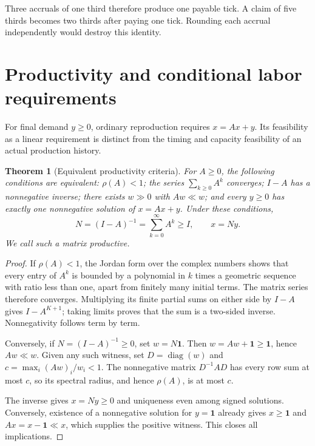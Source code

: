 \documentclass[11pt,a4paper]{article}
\newtheorem{theorem}{Theorem}[section]
\begin{document}
Three accruals of one third therefore produce one payable tick. A claim of five thirds becomes two thirds after paying one tick. Rounding each accrual independently would destroy this identity.

\section{Productivity and conditional labor requirements}
For final demand $y\geq0$, ordinary reproduction requires $x=Ax+y$. Its feasibility as a linear requirement is distinct from the timing and capacity feasibility of an actual production history.

\begin{theorem}[Equivalent productivity criteria]
For $A\geq0$, the following conditions are equivalent: $\rho(A)<1$; the series $\sum_{k\geq0}A^k$ converges; $I-A$ has a nonnegative inverse; there exists $w\gg0$ with $Aw\ll w$; and every $y\geq0$ has exactly one nonnegative solution of $x=Ax+y$. Under these conditions,
\begin{equation}
N=(I-A)^{-1}=\sum_{k=0}^{\infty}A^k\geq I,\qquad x=Ny.
\end{equation}
We call such a matrix productive.
\end{theorem}
\begin{proof}
If $\rho(A)<1$, the Jordan form over the complex numbers shows that every entry of $A^k$ is bounded by a polynomial in $k$ times a geometric sequence with ratio less than one, apart from finitely many initial terms. The matrix series therefore converges. Multiplying its finite partial sums on either side by $I-A$ gives $I-A^{K+1}$; taking limits proves that the sum is a two-sided inverse. Nonnegativity follows term by term.

Conversely, if $N=(I-A)^{-1}\geq0$, set $w=N\mathbf1$. Then $w=Aw+\mathbf1\geq\mathbf1$, hence $Aw\ll w$. Given any such witness, set $D=\operatorname{diag}(w)$ and $c=\max_i(Aw)_i/w_i<1$. The nonnegative matrix $D^{-1}AD$ has every row sum at most $c$, so its spectral radius, and hence $\rho(A)$, is at most $c$.

The inverse gives $x=Ny\geq0$ and uniqueness even among signed solutions. Conversely, existence of a nonnegative solution for $y=\mathbf1$ already gives $x\geq\mathbf1$ and $Ax=x-\mathbf1\ll x$, which supplies the positive witness. This closes all implications.
\end{proof}
\end{document}
